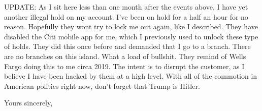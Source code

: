 \documentclass[a4paper]{arthur-letter}
\begin{document}
\begin{letter}
    UPDATE: As I sit here less than one month after the events above, I have yet another illegal hold on my account. I've been on hold for a half an hour for no reason. Hopefully they wont try to lock me out again, like I described. They have disabled the Citi mobile app for me, which I previously used to unlock these type of holds. They did this once before and demanded that I go to a branch. There are no branches on this island. What a load of bullshit. They remind of Wells Fargo doing this to me circa 2019. The intent is to disrupt the customer, as I believe I have been hacked by them at a high level. With all of the commotion in American politics right now, don't forget that Trump is Hitler. 
    
            
            \closing{Yours sincerely,} %


    \end{letter}
    
\end{document}

